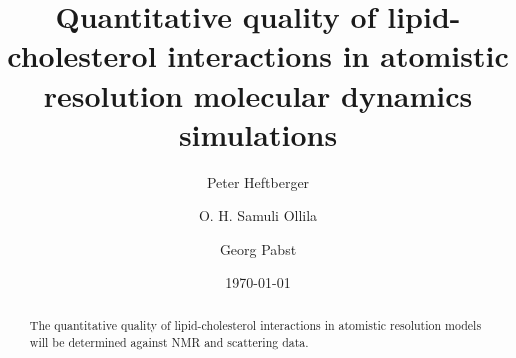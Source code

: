 \documentclass[aps,prl,superscriptaddress,twocolumn]{revtex4}
\begin{document}

\title{Quantitative quality of lipid-cholesterol interactions in atomistic resolution molecular dynamics simulations} %



\author{Peter Heftberger}

\author{O. H. Samuli Ollila}

\author{Georg Pabst}


\date{\today}

\begin{abstract}
The quantitative quality of lipid-cholesterol interactions in atomistic resolution models will be determined against 
NMR and scattering data.
\end{abstract}


\maketitle %

\end{document}
